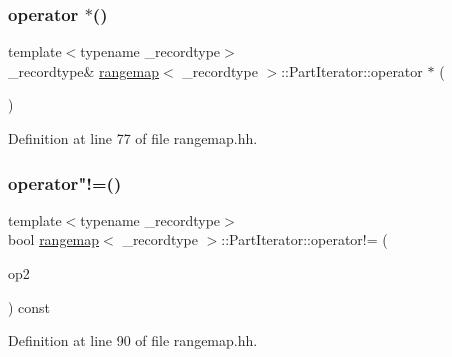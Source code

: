 \mbox{\label{classrangemap_1_1_part_iterator_ac8703a032ed96dc402c04855030a962d}} 
\subsubsection{\texorpdfstring{operator $\ast$()}{operator *()}}
{\footnotesize\ttfamily template$<$typename \+\_\+recordtype$>$ \\
\+\_\+recordtype\& \mbox{\hyperlink{classrangemap}{rangemap}}$<$ \+\_\+recordtype $>$\+::Part\+Iterator\+::operator $\ast$ (\begin{DoxyParamCaption}\item[{void}]{ }\end{DoxyParamCaption})\hspace{0.3cm}{\ttfamily [inline]}}



Definition at line 77 of file rangemap.\+hh.

\mbox{\label{classrangemap_1_1_part_iterator_a23173a96defe433e76badccdc2f964d7}} 
\subsubsection{\texorpdfstring{operator"!=()}{operator!=()}}
{\footnotesize\ttfamily template$<$typename \+\_\+recordtype$>$ \\
bool \mbox{\hyperlink{classrangemap}{rangemap}}$<$ \+\_\+recordtype $>$\+::Part\+Iterator\+::operator!= (\begin{DoxyParamCaption}\item[{const \mbox{\hyperlink{classrangemap_1_1_part_iterator}{Part\+Iterator}} \&}]{op2 }\end{DoxyParamCaption}) const\hspace{0.3cm}{\ttfamily [inline]}}



Definition at line 90 of file rangemap.\+hh.

